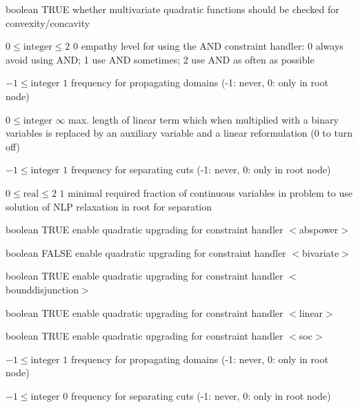 %
{boolean}%
{TRUE}%
{whether multivariate quadratic functions should be checked for convexity/concavity}%
{}

%
{$0\leq\textrm{integer}\leq2$}%
{$0$}%
{empathy level for using the AND constraint handler: 0 always avoid using AND; 1 use AND sometimes; 2 use AND as often as possible}%
{}

%
{$-1\leq\textrm{integer}$}%
{$1$}%
{frequency for propagating domains (-1: never, 0: only in root node)}%
{}

%
{$0\leq\textrm{integer}$}%
{$\infty$}%
{max. length of linear term which when multiplied with a binary variables is replaced by an auxiliary variable and a linear reformulation (0 to turn off)}%
{}

%
{$-1\leq\textrm{integer}$}%
{$1$}%
{frequency for separating cuts (-1: never, 0: only in root node)}%
{}

%
{$0\leq\textrm{real}\leq2$}%
{$1$}%
{minimal required fraction of continuous variables in problem to use solution of NLP relaxation in root for separation}%
{}

%
{boolean}%
{TRUE}%
{enable quadratic upgrading for constraint handler $<$abspower$>$}%
{}

%
{boolean}%
{FALSE}%
{enable quadratic upgrading for constraint handler $<$bivariate$>$}%
{}

%
{boolean}%
{TRUE}%
{enable quadratic upgrading for constraint handler $<$bounddisjunction$>$}%
{}

%
{boolean}%
{TRUE}%
{enable quadratic upgrading for constraint handler $<$linear$>$}%
{}

%
{boolean}%
{TRUE}%
{enable quadratic upgrading for constraint handler $<$soc$>$}%
{}

%
{$-1\leq\textrm{integer}$}%
{$1$}%
{frequency for propagating domains (-1: never, 0: only in root node)}%
{}

%
{$-1\leq\textrm{integer}$}%
{$0$}%
{frequency for separating cuts (-1: never, 0: only in root node)}%
{}

